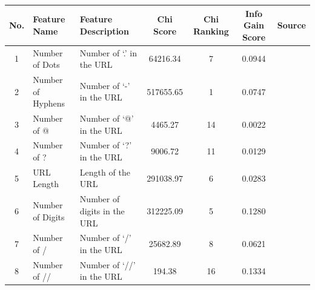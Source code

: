 \documentclass{article}
\begin{document}
    \begin{table}[H]
        \begin{adjustwidth}{-3cm}{}
            \centering
            \begin{tabular}{|c|p{4cm}|p{5cm}|c|c|c|c|}
                \hline
                \textbf{No.} & \textbf{Feature Name}           & \textbf{Feature Description}                   & \textbf{Chi Score} & \textbf{Chi Ranking} & \textbf{Info Gain Score} & \textbf{Source} \\ \hline
                1            & Number of Dots                  & Number of `.' in the URL                       & 64216.34           & 7                    & 0.0944                   & ~\cite{LexicalFeatureSelection}             \\ \hline
                2            & Number of Hyphens               & Number of `-' in the URL                       & 517655.65          & 1                    & 0.0747                   & ~ ~\cite{PhishSafe,LexicalFeatureSelection} \\ \hline
                3            & Number of @                     & Number of `@' in the URL                       & 4465.27            & 14                   & 0.0022                   & ~\cite{PhishSafe,LexicalFeatureSelection} ~ \\ \hline
                4            & Number of ?                     & Number of `?' in the URL                       & 9006.72            & 11                   & 0.0129                   & ~\cite{LexicalFeatureSelection}             \\ \hline
                5            & URL Length                      & Length of the URL                              & 291038.97          & 6                    & 0.0283                   & ~\cite{PhishSafe,LexicalFeatureSelection}   \\ \hline
                6            & Number of Digits                & Number of digits in the URL                    & 312225.09          & 5                    & 0.1280                   & ~\cite{PhishingLoginURLDetection}           \\ \hline
                7            & Number of /                     & Number of `/' in the URL                       & 25682.89           & 8                    & 0.0621                   & ~\cite{LexicalFeatureSelection}             \\ \hline
                8            & Number of //                    & Number of `//' in the URL                      & 194.38             & 16                   & 0.1334                   & ~\cite{PhishSafe,LexicalFeatureSelection}   \\ \hline

\end{tabular}
\end{adjustwidth}
\end{table}
\end{document}
